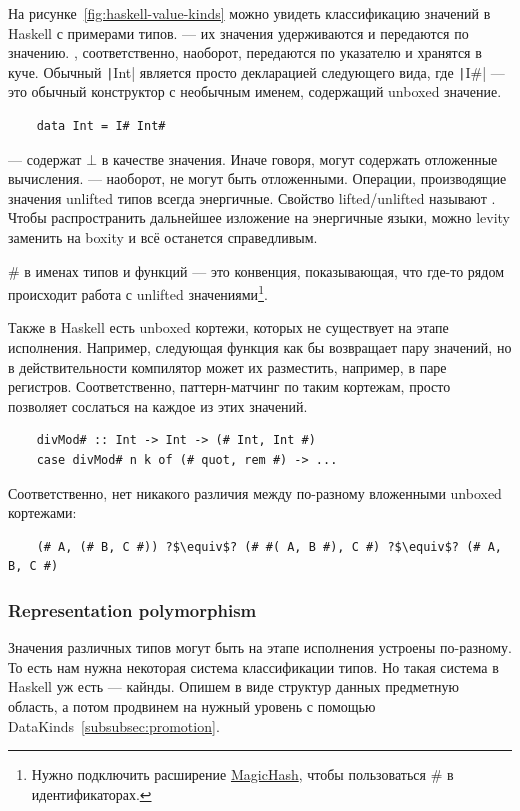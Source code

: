 На рисунке~\ref{fig:haskell-value-kinds} можно увидеть классификацию значений в Haskell с примерами типов.
 --- их значения удерживаются и передаются по значению.
, соответственно, наоборот, передаются по указателю и хранятся в куче.
Обычный \texttt|Int| является просто декларацией следующего вида, где \texttt|I#| --- это обычный конструктор с необычным именем, содержащий unboxed значение.
\begin{verbatim}
    data Int = I# Int#
\end{verbatim}

 --- содержат $\bot$ в качестве значения.
Иначе говоря, могут содержать отложенные вычисления.
 --- наоборот, не могут быть отложенными.
Операции, производящие значения unlifted типов всегда энергичные.
Свойство lifted/unlifted называют .
Чтобы распространить дальнейшее изложение на энергичные языки, можно levity заменить на boxity и всё останется справедливым.

\# в именах типов и функций --- это конвенция, показывающая, что где-то рядом происходит работа с unlifted значениями\footnote{Нужно подключить расширение \href{https://ghc.gitlab.haskell.org/ghc/doc/users_guide/exts/magic_hash.html}{MagicHash}, чтобы пользоваться \# в идентификаторах.}.

Также в Haskell есть unboxed кортежи, которых не существует на этапе исполнения.
Например, следующая функция как бы возвращает пару значений, но в действительности компилятор может их разместить, например, в паре регистров.
Соответственно, паттерн-матчинг по таким кортежам, просто позволяет сослаться на каждое из этих значений.
\begin{verbatim}
    divMod# :: Int -> Int -> (# Int, Int #)
    case divMod# n k of (# quot, rem #) -> ...
\end{verbatim}
Соответственно, нет никакого различия между по-разному вложенными unboxed кортежами:
\begin{verbatim}
    (# A, (# B, C #)) ?$\equiv$? (# #( A, B #), C #) ?$\equiv$? (# A, B, C #)
\end{verbatim}

\subsubsection{Representation polymorphism}

Значения различных типов могут быть на этапе исполнения устроены по-разному.
То есть нам нужна некоторая система классификации типов.
Но такая система в Haskell уж есть --- кайнды.
Опишем в виде структур данных предметную область, а потом продвинем на нужный уровень с помощью DataKinds~\ref{subsubsec:promotion}.

